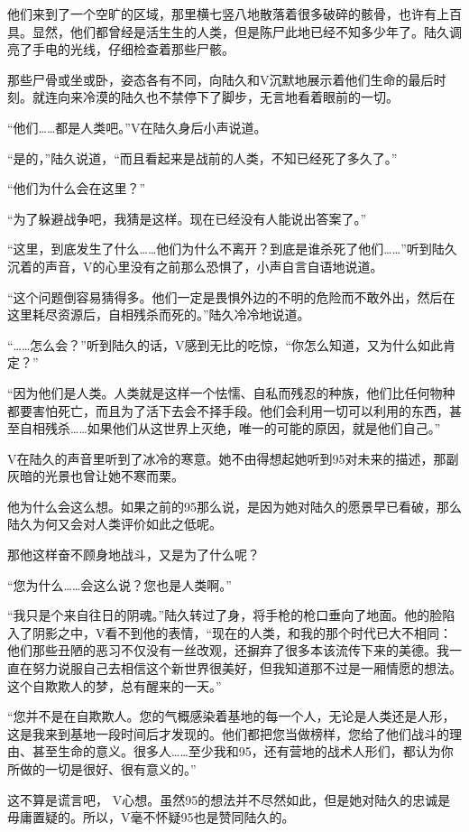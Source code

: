 他们来到了一个空旷的区域，那里横七竖八地散落着很多破碎的骸骨，也许有上百具。显然，他们都曾经是活生生的人类，但是陈尸此地已经不知多少年了。陆久调亮了手电的光线，仔细检查着那些尸骸。

那些尸骨或坐或卧，姿态各有不同，向陆久和V沉默地展示着他们生命的最后时刻。就连向来冷漠的陆久也不禁停下了脚步，无言地看着眼前的一切。

“他们……都是人类吧。”V在陆久身后小声说道。

“是的，”陆久说道，“而且看起来是战前的人类，不知已经死了多久了。”

“他们为什么会在这里？”

“为了躲避战争吧，我猜是这样。现在已经没有人能说出答案了。”

“这里，到底发生了什么……他们为什么不离开？到底是谁杀死了他们……”听到陆久沉着的声音，V的心里没有之前那么恐惧了，小声自言自语地说道。

“这个问题倒容易猜得多。他们一定是畏惧外边的不明的危险而不敢外出，然后在这里耗尽资源后，自相残杀而死的。”陆久冷冷地说道。

“……怎么会？”听到陆久的话，V感到无比的吃惊，“你怎么知道，又为什么如此肯定？”

“因为他们是人类。人类就是这样一个怯懦、自私而残忍的种族，他们比任何物种都要害怕死亡，而且为了活下去会不择手段。他们会利用一切可以利用的东西，甚至自相残杀……如果他们从这世界上灭绝，唯一的可能的原因，就是他们自己。”

V在陆久的声音里听到了冰冷的寒意。她不由得想起她听到95对未来的描述，那副灰暗的光景也曾让她不寒而栗。

他为什么会这么想。如果之前的95那么说，是因为她对陆久的愿景早已看破，那么陆久为何又会对人类评价如此之低呢。

那他这样奋不顾身地战斗，又是为了什么呢？

“您为什么……会这么说？您也是人类啊。”

“我只是个来自往日的阴魂。”陆久转过了身，将手枪的枪口垂向了地面。他的脸陷入了阴影之中，V看不到他的表情，“现在的人类，和我的那个时代已大不相同：他们那些丑陋的恶习不仅没有一丝改观，还摒弃了很多本该流传下来的美德。我一直在努力说服自己去相信这个新世界很美好，但我知道那不过是一厢情愿的想法。这个自欺欺人的梦，总有醒来的一天。”

“您并不是在自欺欺人。您的气概感染着基地的每一个人，无论是人类还是人形，这是我来到基地一段时间后才发现的。他们都把您当做榜样，您给了他们战斗的理由、甚至生命的意义。很多人……至少我和95，还有营地的战术人形们，都认为你所做的一切是很好、很有意义的。”

这不算是谎言吧， V心想。虽然95的想法并不尽然如此，但是她对陆久的忠诚是毋庸置疑的。所以，V毫不怀疑95也是赞同陆久的。

